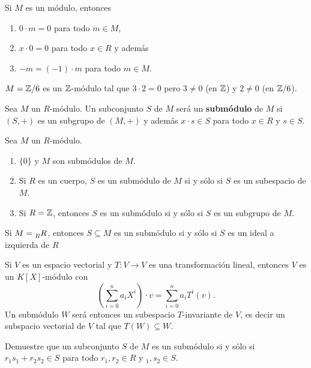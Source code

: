 \begin{exercise}
Si $M$ es un módulo, entonces
\begin{enumerate}
\item $0\cdot m=0$ para todo $m\in M$,
\item $x\cdot 0=0$ para todo $x\in R$ y además
\item $-m=(-1)\cdot m$ para todo $m\in M$. 	
\end{enumerate}
\end{exercise}

\begin{example}
$M=\mathbb{Z}/6$ es un $\mathbb{Z}$-módulo tal que $3\cdot 2=0$ pero $3\ne 0$ (en $\mathbb{Z}$) y $2\ne 0$ (en $\mathbb{Z}/6$).  
\end{example}

\begin{definition}
	Sea $M$ un $R$-módulo. Un subconjunto $S$ de $M$ será un \textbf{submódulo} de $M$ si $(S,+)$ es un subgrupo de $(M,+)$ y además
	$x\cdot s\in S$ para todo $x\in R$ y $s\in S$. 
\end{definition}

\begin{examples}
Sea $M$ un $R$-módulo. 
\begin{enumerate}
\item $\{0\}$ y $M$ son submódulos de $M$.
\item Si $R$ es un cuerpo, $S$ es un submódulo de $M$ si y sólo si $S$ es un subespacio de $M$.
\item Si $R=\mathbb{Z}$, entonces $S$ es un submódulo si y sólo si $S$ es un subgrupo de $M$. 	
\end{enumerate}
\end{examples}

\begin{example}
Si $M=\prescript{}{R}R$, entonces $S\subseteq M$ es un submódulo si y sólo si $S$ es un ideal a izquierda de $R$
\end{example}

\begin{example}
Si $V$ es un espacio vectorial y $T\colon V\to V$ es una transformación lineal, entonces
$V$ es un $K[X]$-módulo con 
\[
\left(\sum_{i=0}^na_iX^i\right)\cdot v=\sum_{i=0}^na_iT^i(v).
\]
Un submódulo $W$ será entonces un subespacio $T$-invariante de $V$, es decir un subspacio vectorial de $V$ 
tal que $T(W)\subseteq W$. 
\end{example}

\begin{exercise}
Demuestre que un subconjunto $S$ de $M$ es un submódulo si y sólo si $r_1s_1+r_2s_2\in S$ para
todo $r_1,r_2\in R$ y $_1,s_2\in S$. 	
\end{exercise}


